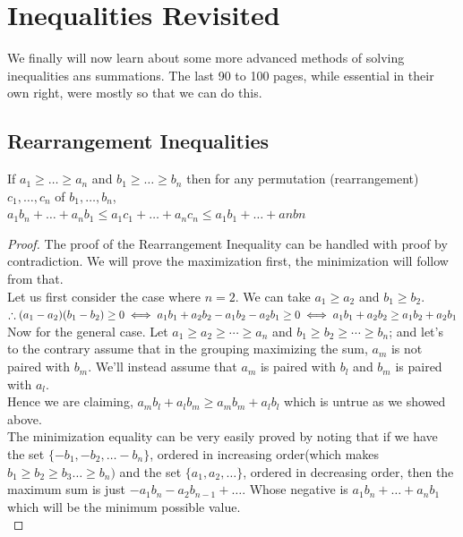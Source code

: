 \chapter{Inequalities Revisited}
We finally will now learn about some more advanced methods of solving inequalities ans summations. The last 90 to 100 pages, while essential in their own right, were mostly so that we can do this.\\
\section{Rearrangement Inequalities}
\begin{theorem}
    If $a_1 \geq \dots \geq a_n$ and $b_1 \geq \dots \geq b_n$ then for any permutation (rearrangement) $c_1, \dots, c_n$ of $b_1, \dots, b_n$,\\
$a_1b_n + \dots + a_nb_1 \leq a_1c_1 +\dots +a_nc_n \leq a_1b_1 + \dots + anbn$
\end{theorem}
\begin{proof}
The proof of the Rearrangement Inequality can be handled with proof by contradiction. We will prove the maximization first, the minimization will follow from that.\\
Let us first consider the case where $n=2$. We can take $a_1 \geq a_2$ and $b_1\geq b_2$.\\
$\therefore (a_1-a_2)(b_1-b_2) \geq 0\\
\iff a_1b_1+a_2b_2-a_1b_2-a_2b_1 \geq 0\\
\iff a_1b_1+a_2b_2 \geq a_1b_2+a_2b_1\\$\\
Now for the general case. Let $a_1 \geq a_2 \geq \cdots \geq a_n$ and $b_1 \geq b_2 \geq \cdots \geq b_n$; and let's to the contrary assume that in the grouping maximizing the sum, $a_m$ is not paired with $b_m$. We'll instead assume that $a_m$ is paired with $b_l$ and $b_m$ is paired with $a_l$.\\
Hence we are claiming, $a_mb_l+a_lb_m \geq a_mb_m+a_lb_l$ which is untrue as we showed above.\\
The minimization equality can be very easily proved by noting that if we have the set $\{-b_1, -b_2, \dots -b_n\}$, ordered in increasing order(which makes $b_1 \geq b_2 \geq b_3 \dots \geq b_n)$ and the set $\{a_1, a_2, \ldots\}$, ordered in decreasing order, then the maximum sum is just $-a_1b_n - a_2b_{n-1} + \dots$. Whose negative is $a_1b_n + \dots + a_nb_1$ which will be the minimum possible value.\\ 
\end{proof}
